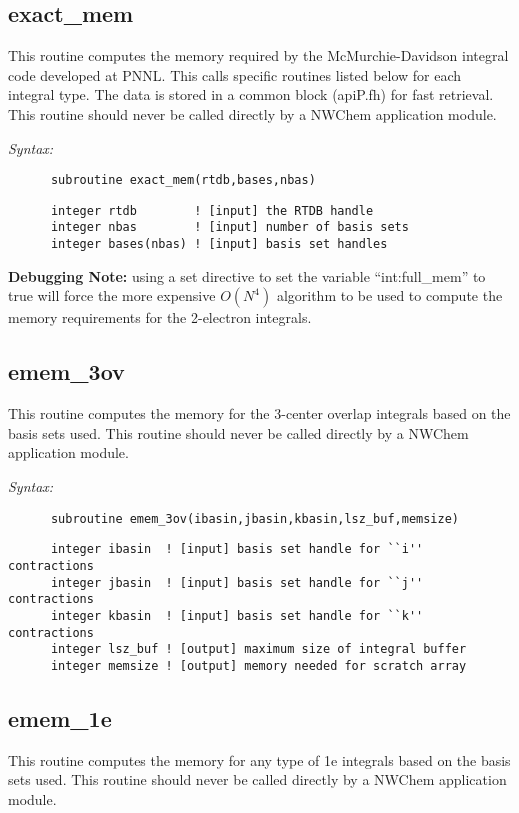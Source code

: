 \subsection{exact\_mem} 
This routine computes the memory required by the  
McMurchie-Davidson integral code developed at PNNL.   
This calls specific routines listed below for each  
integral type.  The data is stored in a common block  
(apiP.fh) for fast retrieval. 
This routine should never be called directly by a  
NWChem application module. 
    
{\it Syntax:} 
\begin{verbatim} 
      subroutine exact_mem(rtdb,bases,nbas) 
\end{verbatim} 
\begin{verbatim} 
      integer rtdb        ! [input] the RTDB handle 
      integer nbas        ! [input] number of basis sets 
      integer bases(nbas) ! [input] basis set handles 
\end{verbatim} 
 
{\bf Debugging Note:} using a set directive to set the  
variable ``int:full\_mem'' to true will force the more  
expensive $O(N^4)$ algorithm to be used to compute the  
memory requirements for the 2-electron integrals. 
 
\subsection{emem\_3ov} 
This routine computes the memory for the 3-center overlap  
integrals based on the basis sets used.   
This routine should never be called directly by a  
NWChem application module. 
 
{\it Syntax:} 
\begin{verbatim} 
      subroutine emem_3ov(ibasin,jbasin,kbasin,lsz_buf,memsize) 
\end{verbatim} 
\begin{verbatim} 
      integer ibasin  ! [input] basis set handle for ``i'' contractions 
      integer jbasin  ! [input] basis set handle for ``j'' contractions 
      integer kbasin  ! [input] basis set handle for ``k'' contractions 
      integer lsz_buf ! [output] maximum size of integral buffer  
      integer memsize ! [output] memory needed for scratch array 
\end{verbatim} 
\subsection{emem\_1e} 
This routine computes the memory for any type of 1e  
integrals based on the basis sets used.   
This routine should never be called directly by a  
NWChem application module. 
 
